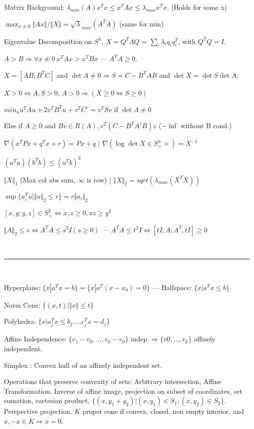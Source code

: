 \documentclass[10pt,twocolumn]{report}
\begin{document}
\raggedright
\footnotesize

Matrix Background: $\lambda_{min}(A)x^Tx \le x^TAx \le \lambda_{max}x^Tx$. (Holds for some x)

$\max_{x \ne 0} \Vert Ax \Vert / \Vert X \Vert = \surd \lambda_{max}(A^TA)$ (same for min)

Eigenvalue Decomposition on $S^n$, $X = Q^T\Lambda Q$ = $\sum_i \lambda_iq_iq_i^T$, with $Q^TQ=I$.

$A > B \Rightarrow \forall x \ne 0 ~ x^TAx > x^TBx$ --- $A^TA \ge 0$.

$X = [A B; B^T C]$ and $\det A \ne 0 \Rightarrow S = C-B^TAB$ and $\det X = \det S \det A$.

 $X > 0 \iff A,S > 0$, $A > 0 \Rightarrow (X \ge 0 \iff S \ge 0)$

$min_u u^TAu + 2v^TB^Tu + v^TC^v = v^TSv$  if $\det A \ne 0$

Else if $A \ge 0$ and $Bv \in R(A), v^T(C - B^TA^{\dagger}B)v$ ($-\inf$ without B cond.)

$\nabla( x^TPx + q^Tx + r )  = Px + q$ | $\nabla(\log \det X \in S^n_++) = X^{-1}$

$(a^Ta)(b^Tb) \le (a^Tb)^2$

$\Vert X \Vert_1$ (Max col abs sum, $\infty$ is row) | $\Vert X \Vert_2 = sqrt(\lambda_{max}(X^TX))$

$\sup \{a_i^Tu | \Vert u \Vert_2 \le r\} = r \Vert a_i \Vert_2$

$[x, y; y, z] \in S_+^2 \iff x,z \ge 0, xz \ge y^2$

$ \Vert A \Vert_2 \le s \iff A^TA \le s^2I (s \ge 0)$ --- $A^TA \le t^2I \iff [tI,A;A^T,tI] \ge 0$

~

\hrule

~

Hyperplane: $\{x | a^Tx = b\} = \{x | a^T(x - x_0) = 0\}$ --- Halfspace: $\{x | a^Tx \le b\}$.

Norm Cone: $\{(x,t) | \Vert x \Vert \le t\} $

Polyhedra: $\{x | a_j^T x \le b_j, ... c_j^Tx = d_j\}$

Affine Independence: $\{v_1 - v_0, ..., v_k - v_0\}$ indep $\Rightarrow \{v0,...,v_k\}$ affinely independent. 

Simplex : Convex hull of an affinely independent set.

Operations that preserve convexity of sets: Arbitrary intersection, Affine Transformation, Inverse of affine image, projection on subset of coordinates, set sumation, cartesian product, $\{(x,y_1+y_2) | (x,y_1) \in S_1, (x,y_2) \in S_2 \}$. Perspective projection.
$K$ proper cone if convex, closed, non empty interior, and $x,-x \in K \Rightarrow x = 0$.
\end{document}
